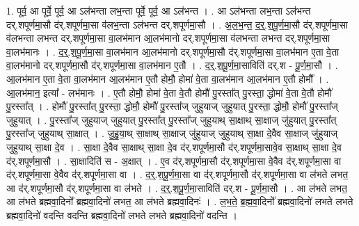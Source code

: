 \documentclass[17pt]{extarticle}
\begin{document}
1. पूर्व॒ आ पूर्वे॒ पूर्व॒ आ ऽल॑भन्ता लभ॒न्ता पूर्वे॒ पूर्व॒ आ ऽल॑भन्त । . आ ऽल॑भन्ता लभ॒न्ता ऽल॑भन्त दर्.शपूर्णमा॒सौ द॑र्.शपूर्णमा॒सा व॑लभ॒न्ता ऽल॑भन्त दर्.शपूर्णमा॒सौ । . अ॒ल॒भ॒न्त॒ द॒र्॒.श॒पू॒र्ण॒मा॒सौ द॑र्.शपूर्णमा॒सा व॑लभन्ता लभन्त दर्.शपूर्णमा॒सा वा॒लभ॑मान आ॒लभ॑मानो दर्.शपूर्णमा॒सा व॑लभन्ता लभन्त दर्.शपूर्णमा॒सा वा॒लभ॑मानः । . द॒र्॒.श॒पू॒र्ण॒मा॒सा वा॒लभ॑मान आ॒लभ॑मानो दर्.शपूर्णमा॒सौ द॑र्.शपूर्णमा॒सा वा॒लभ॑मान ए॒ता वे॒ता वा॒लभ॑मानो दर्.शपूर्णमा॒सौ द॑र्.शपूर्णमा॒सा वा॒लभ॑मान ए॒तौ । . द॒र्॒.श॒पू॒र्ण॒मा॒साविति॑ दर्.श - पू॒र्ण॒मा॒सौ । . आ॒लभ॑मान ए॒ता वे॒ता वा॒लभ॑मान आ॒लभ॑मान ए॒तौ होमौ॒ होमा॑ वे॒ता वा॒लभ॑मान आ॒लभ॑मान ए॒तौ होमौ᳚ । . आ॒लभ॑मान॒ इत्या᳚ - लभ॑मानः । . ए॒तौ होमौ॒ होमा॑ वे॒ता वे॒तौ होमौ॑ पु॒रस्ता᳚त् पु॒रस्ता॒ द्धोमा॑ वे॒ता वे॒तौ होमौ॑ पु॒रस्ता᳚त् । . होमौ॑ पु॒रस्ता᳚त् पु॒रस्ता॒ द्धोमौ॒ होमौ॑ पु॒रस्ता᳚ज् जुहुयाज् जुहुयात् पु॒रस्ता॒ द्धोमौ॒ होमौ॑ पु॒रस्ता᳚ज् जुहुयात् । . पु॒रस्ता᳚ज् जुहुयाज् जुहुयात् पु॒रस्ता᳚त् पु॒रस्ता᳚ज् जुहुयाथ् सा॒क्षाथ् सा॒क्षाज् जु॑हुयात् पु॒रस्ता᳚त् पु॒रस्ता᳚ज् जुहुयाथ् सा॒क्षात् । . जु॒हु॒या॒थ् सा॒क्षाथ् सा॒क्षाज् जु॑हुयाज् जुहुयाथ् सा॒क्षा दे॒वैव सा॒क्षाज् जु॑हुयाज् जुहुयाथ् सा॒क्षा दे॒व । . सा॒क्षा दे॒वैव सा॒क्षाथ् सा॒क्षा दे॒व द॑र्.शपूर्णमा॒सौ द॑र्.शपूर्णमा॒सावे॒व सा॒क्षाथ् सा॒क्षा दे॒व द॑र्.शपूर्णमा॒सौ । . सा॒क्षादिति॑ स - अ॒क्षात् । . ए॒व द॑र्.शपूर्णमा॒सौ द॑र्.शपूर्णमा॒सा वे॒वैव द॑र्.शपूर्णमा॒सा वा द॑र्.शपूर्णमा॒सा वे॒वैव द॑र्.शपूर्णमा॒सा वा । . द॒र्॒.श॒पू॒र्ण॒मा॒सा वा द॑र्.शपूर्णमा॒सौ द॑र्.शपूर्णमा॒सा वा ल॑भते लभत॒ आ द॑र्.शपूर्णमा॒सौ द॑र्.शपूर्णमा॒सा वा ल॑भते । . द॒र्॒.श॒पू॒र्ण॒मा॒साविति॑ दर्.श - पू॒र्ण॒मा॒सौ । . आ ल॑भते लभत॒ आ ल॑भते ब्रह्मवा॒दिनो᳚ ब्रह्मवा॒दिनो॑ लभत॒ आ ल॑भते ब्रह्मवा॒दिनः॑ । . ल॒भ॒ते॒ ब्र॒ह्म॒वा॒दिनो᳚ ब्रह्मवा॒दिनो॑ लभते लभते ब्रह्मवा॒दिनो॑ वदन्ति वदन्ति ब्रह्मवा॒दिनो॑ लभते लभते ब्रह्मवा॒दिनो॑ वदन्ति । \newline
\end{document}
